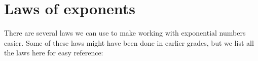 





\section {Laws of exponents}
There are several laws we can use to make working with exponential numbers easier. 
Some of these laws might have been done in earlier grades, but we list all the laws here for easy reference: 

